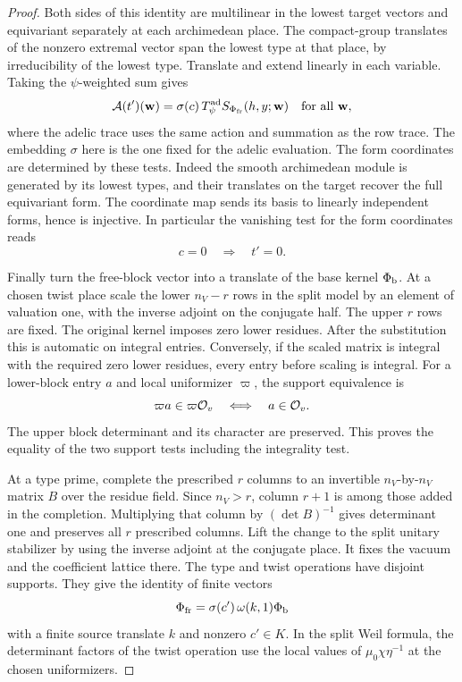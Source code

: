 \begin{proof}
Both sides of this identity are multilinear in the
lowest target vectors and equivariant separately at
each archimedean place. The compact-group translates of
the nonzero extremal vector span the lowest type at
that place, by irreducibility of the lowest type.
Translate and extend linearly in each variable. Taking
the \(\psi\)-weighted sum gives
\begin{equation}\label{eq:off-prime-trace-identity}
 \mathcal A(t')(\mathbf w)
    =\sigma(c)\, T_{\psi}^{\mathrm{ad}}
                   S_{\Phi_{\rm fr}}(h,y;\mathbf w)
 \quad\text{for all }\mathbf w,
\end{equation}
where the adelic trace uses the same action and summation
as the row trace. The embedding \(\sigma\) here is the
one fixed for the adelic evaluation. The form coordinates
are determined by these tests. Indeed the smooth
archimedean module is generated by its lowest types, and
their translates on the target recover the full
equivariant form. The coordinate map sends its basis to linearly independent forms, hence is injective. In particular the vanishing test for the form coordinates reads
\[
  c=0\quad\Longrightarrow\quad t'=0.
\]
\label{cor:paired-off-prime-trace-7}

Finally turn the free-block vector into a translate
of the base kernel \(\Phi_{\rm b}\). At a chosen twist
place scale the lower \(n_V-r\) rows in the split model
by an element of valuation one, with the inverse adjoint
on the conjugate half. The upper \(r\) rows are fixed.
The original kernel imposes zero lower residues. After
the substitution this is automatic on integral entries.
Conversely, if the scaled matrix is integral with the
required zero lower residues, every entry before scaling
is integral.
For a lower-block entry \(a\) and local uniformizer \(\varpi\), the support equivalence is
\[
  \varpi a\in\varpi{\cal O}_v\quad\Longleftrightarrow\quad a\in{\cal O}_v .
\]
 The upper block determinant and its
character are preserved. This proves the equality of
the two support tests including the integrality test.

At a type prime, complete the prescribed \(r\) columns to an
invertible \(n_V\)-by-\(n_V\) matrix \(B\) over the residue field.
Since \(n_V>r\), column \(r+1\) is among those added in the completion.
Multiplying that column by \((\det B)^{-1}\) gives determinant one and
preserves all \(r\) prescribed columns. Lift the change to the split unitary
stabilizer by using the inverse adjoint at the conjugate
place. It fixes the vacuum and the coefficient lattice
there. The type and twist operations have disjoint
supports. They give the identity of finite vectors
\[
      \Phi_{\rm fr}=\sigma(c')\,\omega(k,1)\Phi_{\rm b}
\]
with a finite source translate \(k\) and nonzero \(c'\in
K\). In the split Weil formula, the determinant factors
of the twist operation use the local values of
\(\mu_0\chi\eta^{-1}\) at the chosen uniformizers.


\end{proof}
